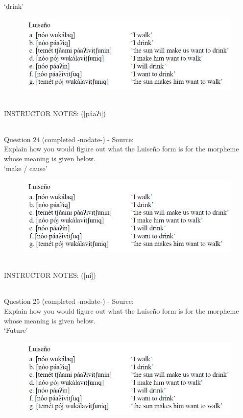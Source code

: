 \documentclass[12pt]{article}
\begin{document}
‘drink’

\begin{figure}[H]
\includegraphics{../images/luiseno.png}
\end{figure}

~\\
INSTRUCTOR NOTES: ([páaʔi])


~\\

{\large Question 24} (completed -nodate-) - Source: \\

Explain how you would figure out what the Luiseño form is for the morpheme whose meaning is given below.\\

‘make / cause’

\begin{figure}[H]
\includegraphics{../images/luiseno.png}
\end{figure}

~\\
INSTRUCTOR NOTES: ([ni])


~\\

{\large Question 25} (completed -nodate-) - Source: \\

Explain how you would figure out what the Luiseño form is for the morpheme whose meaning is given below.\\

‘Future’

\begin{figure}[H]
\includegraphics{../images/luiseno.png}
\end{figure}
\end{document}
